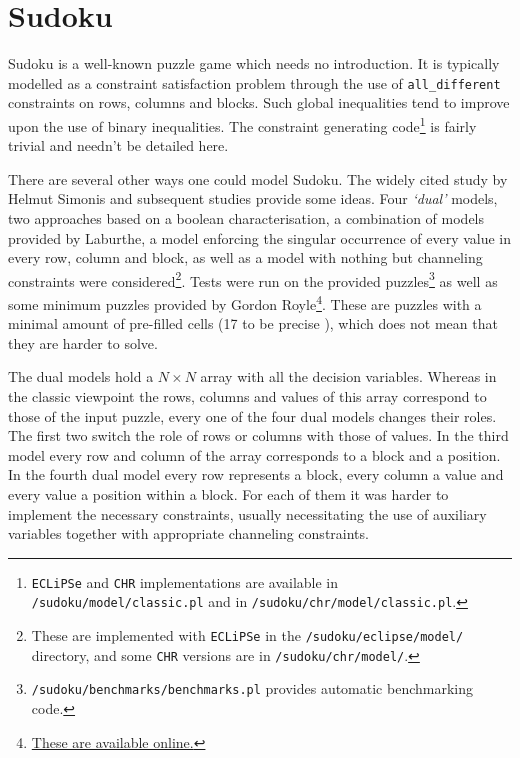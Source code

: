 \section{Sudoku}

Sudoku is a well-known puzzle game which needs no introduction. It is typically modelled as a constraint satisfaction problem through the use of \texttt{all\_different} constraints on rows, columns and blocks. Such global inequalities tend to improve upon the use of binary inequalities. The constraint generating code\footnote{\texttt{ECLiPSe} and \texttt{CHR} implementations are available in \texttt{/sudoku/model/classic.pl} and in \texttt{/sudoku/chr/model/classic.pl}.} is fairly trivial and needn't be detailed here. \\\par

There are several other ways one could model Sudoku. The widely cited study by Helmut Simonis \cite{article:simonis} and subsequent studies provide some ideas. Four \textit{`dual'} models, two approaches based on a boolean characterisation, a combination of models provided by Laburthe, a model enforcing the singular occurrence of every value in every row, column and block, as well as a model with nothing but channeling constraints were considered\footnote{These are implemented with \texttt{ECLiPSe} in the \texttt{/sudoku/eclipse/model/} directory, and some \texttt{CHR} versions are in \texttt{/sudoku/chr/model/}.}. Tests were run on the provided puzzles\footnote{\texttt{/sudoku/benchmarks/benchmarks.pl} provides automatic benchmarking code.} as well as some minimum puzzles provided by Gordon Royle\footnote{\href{http://rotor.di.unipi.it/cisterni/Shared\%20Documents/minsudoku.html}{These are available online.}}. These are puzzles with a minimal amount of pre-filled cells (17 to be precise \cite{article:mcguire}), which does not mean that they are harder to solve. \\\par

The dual models hold a $N\times N$ array with all the decision variables. Whereas in the classic viewpoint the rows, columns and values of this array correspond to those of the input puzzle, every one of the four dual models changes their roles. The first two switch the role of rows or columns with those of values. In the third model every row and column of the array corresponds to a block and a position. In the fourth dual model every row represents a block, every column a value and every value a position within a block. For each of them it was harder to implement the necessary constraints, usually necessitating the use of auxiliary variables together with appropriate channeling constraints.\\\par  

